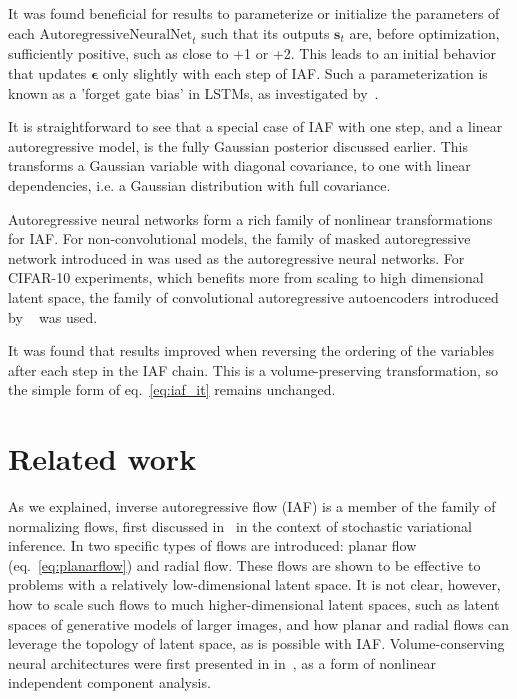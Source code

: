 \documentclass[MAL,biber]{nowfnt} %
\newcommand{\beps}{\boldsymbol{\epsilon}}
\newcommand{\bs}{\mathbf{s}}
\begin{document}
It was found beneficial for results to parameterize or initialize the parameters of each $\text{AutoregressiveNeuralNet}_t$ such that its outputs $\bs_t$ are, before optimization, sufficiently positive, such as close to +1 or +2. This leads to an initial behavior that updates $\beps$ only slightly with each step of IAF. Such a parameterization is known as a 'forget gate bias' in LSTMs, as investigated by~\cite{jozefowicz2015empirical}.

 It is straightforward to see that a special case of IAF with one step, and a linear autoregressive model, is the fully Gaussian posterior discussed earlier. This transforms a Gaussian variable with diagonal covariance, to one with linear dependencies, i.e. a Gaussian distribution with full covariance.

 Autoregressive neural networks form a rich family of nonlinear transformations for IAF. For non-convolutional models, the family of masked autoregressive network introduced in \citep{germain2015made} was used as the autoregressive neural networks. For CIFAR-10 experiments, which benefits more from scaling to high dimensional latent space, the family of convolutional autoregressive autoencoders introduced by ~\citep{pixelrnn,van2016conditional} was used.

It was found that results improved when reversing the ordering of the variables after each step in the IAF chain. This is a volume-preserving transformation, so the simple form of eq.~\eqref{eq:iaf_it} remains unchanged.


\section{Related work}

As we explained, inverse autoregressive flow (IAF) is a member of the family of normalizing flows, first discussed in~\citep{rezende2015variational} in the context of stochastic variational inference. In \citep{rezende2015variational} two specific types of flows are introduced: planar flow (eq.~\eqref{eq:planarflow}) and radial flow. These flows are shown to be effective to problems with a relatively low-dimensional latent space. It is not clear, however, how to scale such flows to much higher-dimensional latent spaces, such as latent spaces of generative models of larger images, and how planar and radial flows can leverage the topology of latent space, as is possible with IAF. Volume-conserving neural architectures were first presented in in~\citep{deco1995higher}, as a form of nonlinear independent component analysis.
\end{document}
